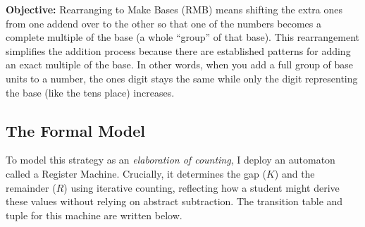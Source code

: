 \documentclass[12pt]{book}
\begin{document}
 \textbf{Objective:} Rearranging to Make Bases (RMB) means shifting the extra ones from one addend over to the other so that one of the numbers becomes a complete multiple of the base (a whole ``group'' of that base). This rearrangement simplifies the addition process because there are established patterns for adding an exact multiple of the base. In other words, when you add a full group of base units to a number, the ones digit stays the same while only the digit representing the base (like the tens place) increases.
   

\subsection{The Formal Model}
To model this strategy as an \textit{elaboration of counting}, I deploy an automaton called a Register Machine. Crucially, it determines the gap ($K$) and the remainder ($R$) using iterative counting, reflecting how a student might derive these values without relying on abstract subtraction. The transition table and tuple for this machine are written below. 
\end{document}
